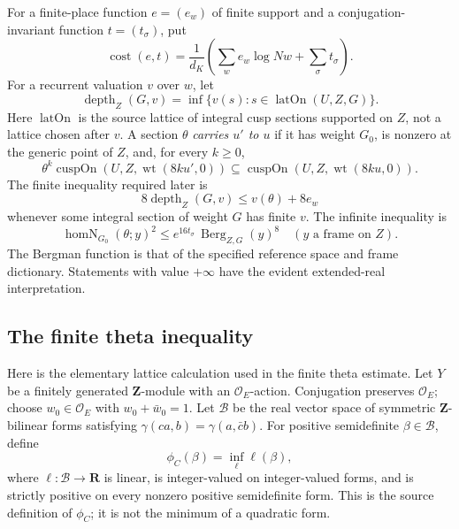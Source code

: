 For a finite-place function \(e=(e_w)\) of finite support and a
conjugation-invariant function \(t=(t_\sigma)\), put
\[
 \operatorname{cost}(e,t)=\frac1{d_K}
  \left(\sum_w e_w\log Nw+\sum_\sigma t_\sigma\right).
\]
For a recurrent valuation \(v\) over \(w\), let
\[
 \operatorname{depth}_Z(G,v)
   =\inf\{v(s):s\in\operatorname{latOn}(U,Z,G)\}.
\]
Here \(\operatorname{latOn}\) is the source lattice of integral cusp
sections supported on \(Z\), not a lattice chosen after \(v\).
A section \(\theta\) \emph{carries \(u'\) to \(u\)} if it has weight
\(G_0\), is nonzero at the generic point of \(Z\), and, for every
\(k\geq0\),
\[
 \theta^k\operatorname{cuspOn}(U,Z,\operatorname{wt}(8ku',0))
 \subseteq
 \operatorname{cuspOn}(U,Z,\operatorname{wt}(8ku,0)).
 \tag{C1}\label{eq:ftb-carries}
\]
The finite inequality required later is
\[
 8\operatorname{depth}_Z(G,v)
       \leq v(\theta)+8e_w                         \tag{C2}\label{eq:ftb-finbd}
\]
whenever some integral section of weight \(G\) has finite \(v\).
The infinite inequality is
\[
 \operatorname{homN}_{G_0}(\theta;y)^2
   \leq e^{16t_\sigma}\,
           \operatorname{Berg}_{Z,G}(y)^8
 \quad (y\text{ a frame on }Z).                    \tag{C3}\label{eq:ftb-infbd}
\]
The Bergman function is that of the specified reference space and frame
dictionary.  Statements with value \(+\infty\) have the evident
extended-real interpretation.

\subsection{The finite theta inequality}
Here is the elementary lattice calculation used in the finite
theta estimate.  Let \(Y\) be a finitely generated
\(\mathbf Z\)-module with an \(\mathcal O_E\)-action.  Conjugation
preserves \(\mathcal O_E\); choose \(w_0\in\mathcal O_E\) with
\(w_0+\bar w_0=1\).  Let \(\mathcal B\) be the real vector space of
symmetric \(\mathbf Z\)-bilinear forms satisfying
\(\gamma(ca,b)=\gamma(a,\bar c b)\).
For positive semidefinite \(\beta\in\mathcal B\), define
\[
 \phi_C(\beta)=
 \inf_{\ell}\ell(\beta),                           \tag{C4}\label{eq:ftb-phic}
\]
where \(\ell:\mathcal B\to\mathbf R\) is linear, is integer-valued
on integer-valued forms, and is strictly positive on every nonzero
positive semidefinite form.  This is the source definition of
\(\phi_C\); it is not the minimum of a quadratic form.

